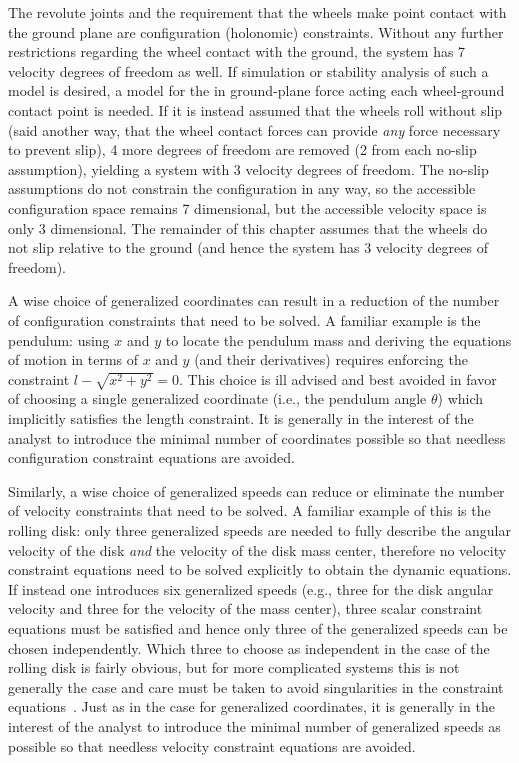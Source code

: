 The revolute joints and the requirement that the wheels make point contact with
the ground plane are configuration (holonomic) constraints. Without any further
restrictions regarding the wheel contact with the ground, the system has 7
velocity degrees of freedom as well. If simulation or stability analysis of
such a model is desired, a model for the in ground-plane force acting each
wheel-ground contact point is needed. If it is instead assumed that the wheels
roll without slip (said another way, that the wheel contact forces can provide
\textit{any} force necessary to prevent slip), 4 more degrees of freedom are
removed (2 from each no-slip assumption), yielding a system with 3 velocity
degrees of freedom. The no-slip assumptions do not constrain the configuration
in any way, so the accessible configuration space remains 7 dimensional, but
the accessible velocity space is only 3 dimensional.  The remainder of this
chapter assumes that the wheels do not slip relative to the ground (and hence
the system has 3 velocity degrees of freedom).

A wise choice of generalized coordinates can result in a reduction of the
number of configuration constraints that need to be solved. A familiar example
is the pendulum: using $x$ and $y$ to locate the pendulum mass and deriving the
equations of motion in terms of $x$ and $y$ (and their derivatives) requires
enforcing the constraint $l - \sqrt{x^2 + y^2} = 0$. This choice is ill advised
and best avoided in favor of choosing a single generalized coordinate (i.e.,
the pendulum angle $\theta$) which implicitly satisfies the length constraint.
It is generally in the interest of the analyst to introduce the minimal
number of coordinates possible so that needless configuration constraint
equations are avoided.

Similarly, a wise choice of generalized speeds can reduce or eliminate the
number of velocity constraints that need to be solved. A familiar example of
this is the rolling disk: only three generalized speeds are needed to fully
describe the angular velocity of the disk \textit{and} the velocity of the disk
mass center, therefore no velocity constraint equations need to be solved
explicitly to obtain the dynamic equations. If instead one introduces six
generalized speeds (e.g., three for the disk angular velocity and three for the
velocity of the mass center), three scalar constraint equations must be
satisfied and hence only three of the generalized speeds can be chosen
independently. Which three to choose as independent in the case of the rolling
disk is fairly obvious, but for more complicated systems this is not generally
the case and care must be taken to avoid singularities in the constraint
equations~\cite{Reckdahl1996}. Just as in the case for generalized coordinates,
it is generally in the interest of the analyst to introduce the minimal number
of generalized speeds as possible so that needless velocity constraint
equations are avoided.


